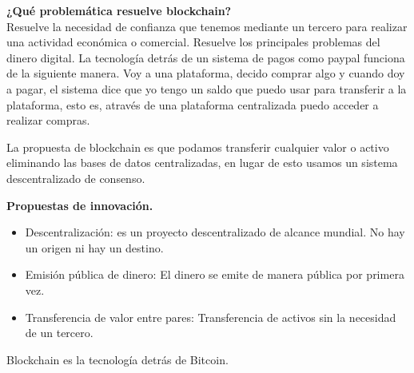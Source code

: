 \documentclass[a4paper,12pt]{lib/pub}
\begin{document}
\textbf{¿Qué problemática resuelve blockchain?}\\
Resuelve la necesidad de confianza que tenemos mediante un tercero para realizar una actividad económica o comercial.
Resuelve los principales problemas del dinero digital.
La tecnología detrás de un sistema de pagos como paypal funciona de la siguiente manera. Voy a una plataforma, decido comprar algo y cuando doy a pagar, el sistema dice que yo tengo un saldo que puedo usar para transferir a la plataforma, esto es, através de una plataforma centralizada puedo acceder a realizar compras. 

La propuesta de blockchain es que podamos transferir cualquier valor o activo eliminando las bases de datos centralizadas, en lugar de esto usamos un sistema descentralizado de consenso.

\textbf{Propuestas de innovación.}
\begin{itemize}
	\item Descentralización: es un proyecto descentralizado de alcance mundial. No hay un origen ni hay un destino.
	\item Emisión pública de dinero: El dinero se emite de manera pública por primera vez.
	\item Transferencia de valor entre pares: Transferencia de activos sin la necesidad de un tercero.
\end{itemize}
Blockchain es la tecnología detrás de Bitcoin.
\end{document}
